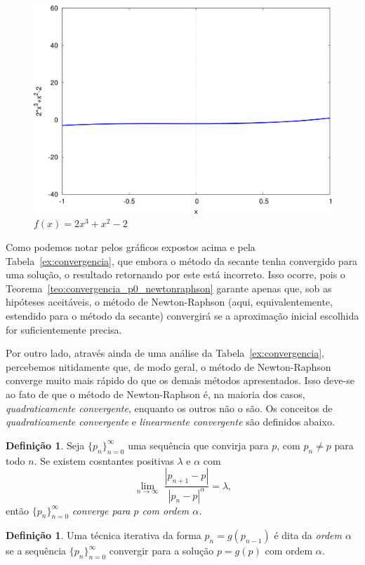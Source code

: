 \documentclass[a4paper, 10pt]{article} %
\newcommand{\limit}[3]{\underset{#1\rightarrow #2}{\lim}{\;#3}}
\theoremstyle{definition}
\theoremstyle{definition}
\newtheorem{definition}[teo]{Definição}
\numberwithin{equation}{section} %
\numberwithin{lstlisting}{section}
\numberwithin{algorithm}{section}
\numberwithin{table}{section}
\begin{document}
\begin{figure}[H]\centering
 \includegraphics[scale = 0.5]{plot2.png}
 \caption{$f(x) = 2x^3 + x^2 -2$}
\end{figure}
Como podemos notar pelos gráficos expostos acima e pela Tabela~\ref{ex:convergencia}, que embora o método da secante tenha convergido para uma solução, o resultado retornando por este está incorreto. Isso ocorre, pois o Teorema~\ref{teo:convergencia_p0_newtonraphson} garante apenas que, sob as hipóteses aceitáveis, o método de Newton-Raphson (aqui, equivalentemente, estendido para o método da secante) convergirá se a aproximação inicial escolhida for suficientemente precisa.

Por outro lado, através ainda de uma análise da Tabela~\ref{ex:convergencia}, percebemos nitidamente que, de modo geral, o método de Newton-Raphson converge muito mais rápido do que os demais métodos apresentados. Isso deve-se ao fato de que o método de Newton-Raphson é, na maioria dos casos, \emph{quadraticamente convergente}, enquanto os outros não o são. Os conceitos de \emph{quadraticamente convergente} e
\emph{linearmente convergente} são definidos abaixo.

\begin{definition}
Seja $\{p_n\}^{\infty}_{n = 0}$ uma sequência que convirja para $p$, com $p_n \neq p$ para todo $n$. Se existem cosntantes positivas $\lambda$ e $\alpha$ com \[\limit{n}{\infty}{\frac{|p_{n+1} - p|}{|p_n - p|^{\alpha}}} = \lambda\text{,}\]
então $\{p_n\}^{\infty}_{n = 0}$ \emph{converge para $p$ com ordem $\alpha$.}
 \end{definition}

\begin{definition}
Uma técnica iterativa da forma $p_n = g(p_{n-1})$ é dita da \emph{ordem $\alpha$} se a sequência $\{p_n\}^{\infty}_{n = 0}$ convergir para a solução $p = g(p)$ com ordem $\alpha$.
 \end{definition}
\end{document}
